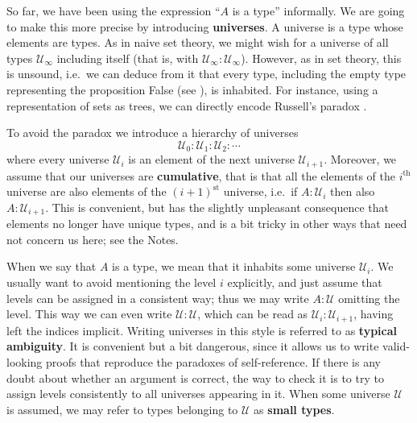 \documentclass[12pt]{article}
\def\index#1{}
\def\indexdef#1{}
\def\indexsee#1#2{}
\def\define#1{\textbf{#1}}
\newcommand{\UU}{\ensuremath{\mathcal{U}}\xspace}
\begin{document}
So far, we have been using the expression ``$A$ is a type'' informally. We
are going to make this more precise by introducing \define{universes}.
\index{type!universe|(defstyle}%
\indexsee{universe}{type, universe}%
A universe is a type whose elements are types. As in naive set theory,
we might wish for a universe of all types $\UU_\infty$ including itself
(that is, with $\UU_\infty : \UU_\infty$).
However, as in set
theory, this is unsound, i.e.\ we can deduce from it that every type,
including the empty type representing the proposition False (see ), is inhabited.
For instance, using a
representation of sets as trees, we can directly encode Russell's
paradox\index{paradox} \cite{coquand:paradox}.

To avoid the paradox we introduce a hierarchy of universes
\indexsee{hierarchy!of universes}{type, universe}%
\[ \UU_0 : \UU_1 : \UU_2 : \cdots \]
where every universe $\UU_i$ is an element of the next universe
$\UU_{i+1}$. Moreover, we assume that our universes are
\define{cumulative},
\indexdef{type!universe!cumulative}%
\indexdef{cumulative!universes}%
that is that all the elements of the $i^{\mathrm{th}}$
universe are also elements of the $(i+1)^{\mathrm{st}}$ universe, i.e.\ if
$A:\UU_i$ then also $A:\UU_{i+1}$.
This is convenient, but has the slightly unpleasant consequence that elements no longer have unique types, and is a bit tricky in other ways that need not concern us here; see the Notes.

When we say that $A$ is a type, we mean that it inhabits some universe
$\UU_i$. We usually want to avoid mentioning the level
\indexdef{universe level}%
\indexsee{level}{universe level or $n$-type}%
\indexsee{type!universe!level}{universe level}%
$i$ explicitly,
and just assume that levels can be assigned in a consistent way; thus we
may write $A:\UU$ omitting the level. This way we can even write
$\UU:\UU$, which can be read as $\UU_i:\UU_{i+1}$, having left the
indices implicit.  Writing universes in this style is referred to as
\define{typical ambiguity}.
\indexdef{typical ambiguity}%
It is convenient but a bit dangerous, since it allows us to write valid-looking proofs that reproduce the paradoxes of self-reference.
If there is any doubt about whether an argument is correct, the way to check it is to try to assign levels consistently to all universes appearing in it.
When some universe \UU is assumed, we may refer to types belonging to \UU as \define{small types}.
\indexdef{small!type}%
\indexdef{type!small}%
\end{document}

